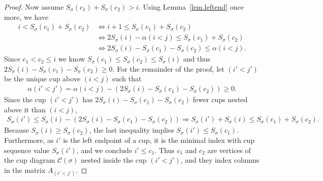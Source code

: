 \documentclass[10pt,a4paper]{amsart}
\newcommand{\al}{\alpha}
\newcommand{\cc}{\mathcal{C}}
\newcommand{\cupsigma}{\cc(\gs)}
\newcommand{\gs}{\sigma}
\begin{document}
\begin{proof}
Now assume $S_\gs(c_1) + S_\gs(c_2)>i$.  Using Lemma~\ref{lem.leftend} once more, we have 
\begin{align*}
i<S_\gs(c_1) + S_\gs(c_2) &\Leftrightarrow i + 1 \leq  S_\gs(c_1) + S_\gs(c_2) \\
& \Leftrightarrow 2 S_{\gs}(i)-\al(i<j) \leq S_\gs(c_1) + S_\gs(c_2) \\
& \Leftrightarrow 2 S_{\gs}(i)- S_\gs(c_1)-S_\gs(c_2) \leq \al(i<j). 
\end{align*}
Since $c_1<c_2\leq i$ we know $S_\gs(c_1)\leq S_\gs(c_2)\leq S_\gs(i)$ and thus $2 S_{\gs}(i)- S_\gs(c_1)-S_\gs(c_2)\geq 0$. For the remainder of the proof, let $(i'<j')$ be the unique cup above $(i<j)$ such that 
\begin{eqnarray}\label{eqn.i'<j'def}
\al(i'<j') = \al(i<j) - \left( 2 S_{\gs}(i)- S_\gs(c_1)-S_\gs(c_2) \right) \geq 0.
\end{eqnarray}
Since the cup $(i'<j')$ has $2 S_{\gs}(i)- S_\gs(c_1)-S_\gs(c_2)$ fewer cups nested above it than $(i<j)$, 
\begin{align*}
S_\gs(i') \leq  S_\gs(i) - \left(2 S_{\gs}(i)- S_\gs(c_1)-S_\gs(c_2) \right) \Rightarrow S_\gs(i')+S_\gs(i) \leq S_\gs(c_1)+S_\gs(c_2).
\end{align*}
Because $S_\gs(i)\geq S_\gs(c_2)$, the last inequality implies $S_\gs(i') \leq S_\gs(c_1)$. Furthermore, as $i'$ is the left endpoint of a cup, it is the minimal index with cup sequence value $S_\gs(i')$, and we conclude $i'\leq c_1$. Thus $c_1$ and $c_2$ are vertices of the cup diagram $\cupsigma$ nested inside the cup $(i'<j')$, and they index columns in the matrix $A_{(i'<j')}$. 



\end{proof}
\end{document}
